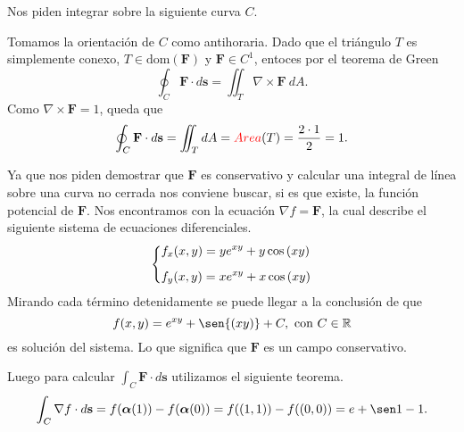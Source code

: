
\begin{solution}
    Nos piden integrar sobre la siguiente curva $C$.

    \begin{center}
    \end{center}

    Tomamos la orientaci\'on de $C$ como antihoraria.
    Dado que el tri\'angulo $T$  es simplemente conexo,   $T
        \in \text{dom}(\mathbf{F})$ y $\mathbf{F}\in C^1$, entoces
    por el teorema de Green
    \[
        \oint_C \mathbf{F}\cdot d\mathbf{s} = \iint_T
        \nabla\times\mathbf{F}\:dA.
    \]
    Como $\nabla\times\mathbf{F} = 1$, queda que \[\oint_C
        \mathbf{F}\cdot d\mathbf{s} = \iint_T dA = \textcolor{red}{Area}(T)
        = \frac{2\cdot1}{2} = 1.\]
\end{solution}


\begin{solution}
    Ya que nos piden demostrar que $\mathbf{F}$ es conservativo
    y calcular una integral de l\'inea sobre una curva no
    cerrada nos conviene buscar, si es que existe, la funci\'on
    potencial de $\mathbf{F}$. Nos encontramos con la ecuaci\'on
    $\nabla f = \mathbf{F}$, la cual describe el siguiente
    sistema de ecuaciones diferenciales.
    \[
        \begin{dcases}
            f_x(x,y) = ye^{xy} + y \cos{(xy)} \\[.2cm]
            f_y(x,y) = xe^{xy} + x \cos{(xy)}
        \end{dcases}
    \]
    Mirando cada t\'ermino detenidamente se puede llegar a
    la conclusi\'on de que $$f(x,y) = e^{xy} + \sen{(xy)} + C,
        \mbox{ con } C\in\Re$$ es soluci\'on del sistema. Lo que
    significa que $\mathbf{F}$ es un campo conservativo.

    Luego para calcular $\int_C \mathbf{F}\cdot d\mathbf{s}$
    utilizamos el siguiente teorema.
    \[
        \int_C \nabla f\cdot d\mathbf{s} =
        f(\boldsymbol{\alpha}(1)) - f(\boldsymbol{\alpha}(0)) =
        f((1,1)) - f((0,0)) = e + \sen1 - 1.
    \]
\end{solution}


